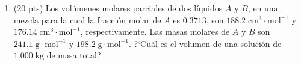 \documentclass[a4paper,12pt]{article}
\begin{document}
\begin{enumerate}
 \item (20 pts) Los vol\'umenes molares parciales de dos l\'iquidos $A$ y $B$, en una mezcla para la cual la fracci\'on molar de $A$ es $0.3713$, son $188.2\;\mbox{cm}^3\cdot\mbox{mol}^{-1}$ y $176.14\;\mbox{cm}^3\cdot\mbox{mol}^{-1}$, respectivamente. Las masas molares de $A$ y $B$ son $241.1\;\mbox{g}\cdot\mbox{mol}^{-1}$ y $198.2\;\mbox{g}\cdot\mbox{mol}^{-1}$. ?`Cu\'al es el volumen de una soluci\'on de $1.000\;\mbox{kg}$ de masa total? %

\end{enumerate}
\end{document}
